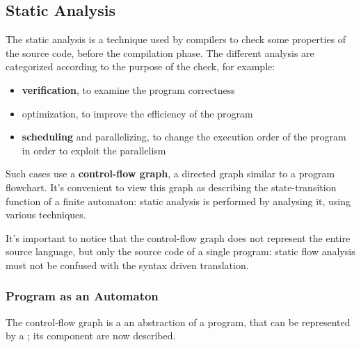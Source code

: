 \documentclass[english]{article}
\begin{document}
\subsection{Static Analysis}

The static analysis is a technique used by compilers to check some properties of the source code, before the compilation phase.
The different analysis are categorized according to the purpose of the check, for example:

\begin{itemize}
  \item \textbf{verification}, to examine the program correctness
  \item optimization, to improve the efficiency of the program
  \item \textbf{scheduling} and parallelizing, to change the execution order of the program in order to exploit the parallelism
\end{itemize}

Such cases use a \textbf{control-flow graph}, a directed graph similar to a program flowchart.
It's convenient to view this graph as describing the state-transition function of a finite automaton:
static analysis is performed by analysing it, using various techniques.

It's important to notice that the control-flow graph does not represent the entire source language, but only the source code of a single program:
static flow analysis must not be confused with the syntax driven translation.

\subsubsection{Program as an Automaton}

The control-flow graph is a an abstraction of a program, that can be represented by a \FSA;
its component are now described.
\end{document}

